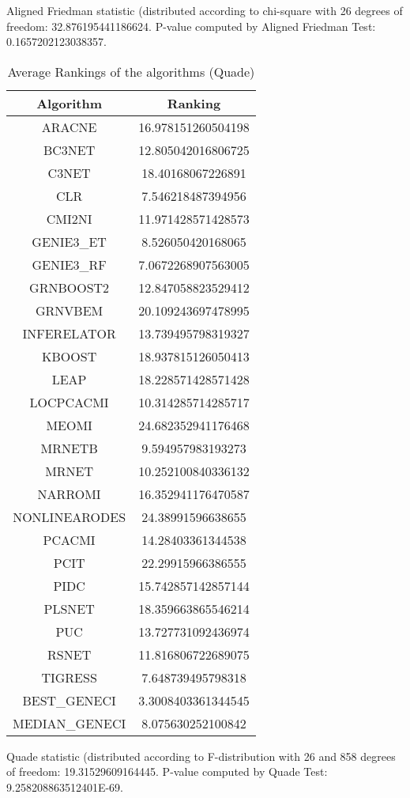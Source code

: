 \documentclass[a4paper,10pt]{article}
\begin{document}
\begin{landscape}
Aligned Friedman statistic (distributed according to chi-square with 26 degrees of freedom: 32.876195441186624. 
P-value computed by Aligned Friedman Test: 0.1657202123038357.\newline


\newpage

\begin{table}[!htp]
\centering
\caption{Average Rankings of the algorithms (Quade)
}\begin{tabular}{c|c}
Algorithm&Ranking\\
\hline
ARACNE&16.978151260504198\\
BC3NET&12.805042016806725\\
C3NET&18.40168067226891\\
CLR&7.546218487394956\\
CMI2NI&11.971428571428573\\
GENIE3_ET&8.526050420168065\\
GENIE3_RF&7.0672268907563005\\
GRNBOOST2&12.847058823529412\\
GRNVBEM&20.109243697478995\\
INFERELATOR&13.739495798319327\\
KBOOST&18.937815126050413\\
LEAP&18.228571428571428\\
LOCPCACMI&10.314285714285717\\
MEOMI&24.682352941176468\\
MRNETB&9.594957983193273\\
MRNET&10.252100840336132\\
NARROMI&16.352941176470587\\
NONLINEARODES&24.38991596638655\\
PCACMI&14.28403361344538\\
PCIT&22.29915966386555\\
PIDC&15.742857142857144\\
PLSNET&18.359663865546214\\
PUC&13.727731092436974\\
RSNET&11.816806722689075\\
TIGRESS&7.648739495798318\\
BEST_GENECI&3.3008403361344545\\
MEDIAN_GENECI&8.075630252100842\\
\end{tabular}
\end{table}
Quade statistic (distributed according to F-distribution with 26 and 858 degrees of freedom: 19.31529609164445. 
P-value computed by Quade Test: 9.258208863512401E-69.\newline



\end{landscape}
\end{document}
